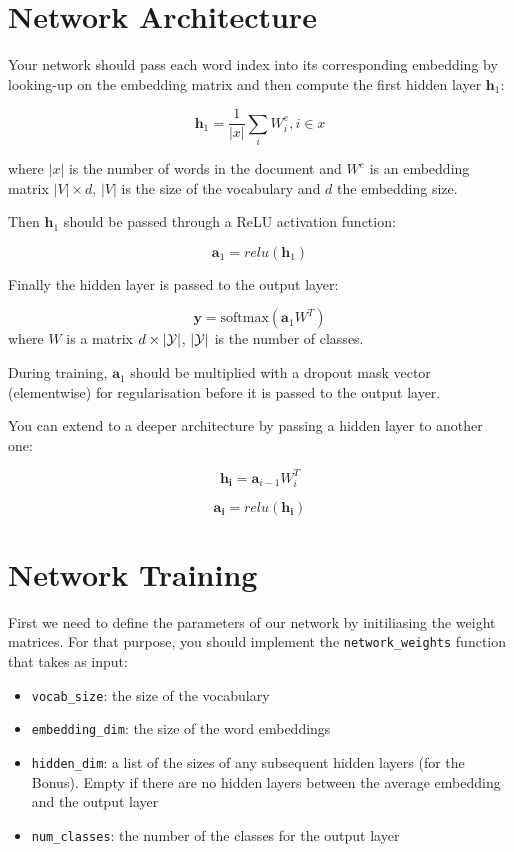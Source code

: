 \documentclass[11pt]{article}
\providecommand{\tightlist}{%
      \setlength{\itemsep}{0pt}\setlength{\parskip}{0pt}}
\begin{document}
    \hypertarget{network-architecture}{%
\section{Network Architecture}\label{network-architecture}}

Your network should pass each word index into its corresponding
embedding by looking-up on the embedding matrix and then compute the
first hidden layer \(\mathbf{h}_1\):

\[\mathbf{h}_1 = \frac{1}{|x|}\sum_i W^e_i, i \in x\]

where \(|x|\) is the number of words in the document and \(W^e\) is an
embedding matrix \(|V|\times d\), \(|V|\) is the size of the vocabulary
and \(d\) the embedding size.

Then \(\mathbf{h}_1\) should be passed through a ReLU activation
function:

\[\mathbf{a}_1 = relu(\mathbf{h}_1)\]

Finally the hidden layer is passed to the output layer:

\[\mathbf{y} = \text{softmax}(\mathbf{a}_1W^T) \] where \(W\) is a
matrix \(d \times |{\cal Y}|\), \(|{\cal Y}|\) is the number of classes.

During training, \(\mathbf{a}_1\) should be multiplied with a dropout
mask vector (elementwise) for regularisation before it is passed to the
output layer.

You can extend to a deeper architecture by passing a hidden layer to
another one:

\[\mathbf{h_i} = \mathbf{a}_{i-1}W_i^T \]

\[\mathbf{a_i} = relu(\mathbf{h_i}) \]

\hypertarget{network-training}{%
\section{Network Training}\label{network-training}}

First we need to define the parameters of our network by initiliasing
the weight matrices. For that purpose, you should implement the
\texttt{network\_weights} function that takes as input:

\begin{itemize}
\tightlist
\item
  \texttt{vocab\_size}: the size of the vocabulary
\item
  \texttt{embedding\_dim}: the size of the word embeddings
\item
  \texttt{hidden\_dim}: a list of the sizes of any subsequent hidden
  layers (for the Bonus). Empty if there are no hidden layers between
  the average embedding and the output layer
\item
  \texttt{num\_classes}: the number of the classes for the output layer
\end{itemize}
\end{document}
